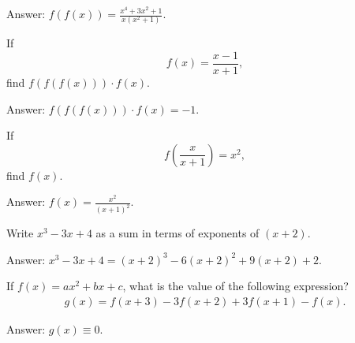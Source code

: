 \documentclass[12pt,a4paper]{memoir}
\theoremstyle{definition}
\begin{document}
\begin{solution}[name=Solution by Parviz Shahriari]
	Answer: $f(f(x))= \frac{x^4+3x^2+1}{x(x^2+1)}$.
\end{solution}

\begin{tcolorbox}
	\begin{question}
		If \[f(x)=\frac{x-1}{x+1},\] find $f(f(f(x)))\cdot f(x)$.
	\end{question}
\end{tcolorbox}

\begin{solution}[name=Solution by Parviz Shahriari]
	Answer: $f(f(f(x)))\cdot f(x) = -1$.
\end{solution}


\begin{tcolorbox}
	\begin{question}
		If \[f\left(\frac{x}{x+1}\right)=x^2,\] find $f(x)$.
	\end{question}
\end{tcolorbox}

\begin{solution}[name=Solution by Parviz Shahriari]
	Answer: $f(x) = \frac{x^2}{(x+1)^2}$.
\end{solution}



\begin{tcolorbox}
	\begin{question}
		Write $x^3-3x+4$ as a sum in terms of exponents of $(x+2)$.
	\end{question}
\end{tcolorbox}

\begin{solution}[name=Solution by Parviz Shahriari]
	Answer: $x^3-3x+4 = (x+2)^3 -6(x+2)^2 + 9(x+2) + 2$.
\end{solution}


\begin{tcolorbox}
	\begin{question}
		If $f(x)=ax^2+bx+c$, what is the value of the following expression?
		\begin{align*}
			g(x) = f(x+3) - 3f(x+2) + 3f(x+1) - f(x).
		\end{align*}
	\end{question}
\end{tcolorbox}

\begin{solution}[name=Solution by Parviz Shahriari]
	Answer: $g(x) \equiv 0$.
\end{solution}
\end{document}
